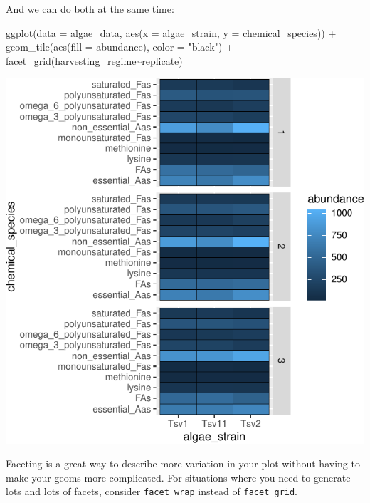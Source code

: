 \documentclass[
]{krantz}
\newenvironment{Shaded}{\begin{snugshade}}{\end{snugshade}}
\newcommand{\AttributeTok}[1]{\textcolor[rgb]{0.77,0.63,0.00}{#1}}
\newcommand{\FunctionTok}[1]{\textcolor[rgb]{0.00,0.00,0.00}{#1}}
\newcommand{\NormalTok}[1]{#1}
\newcommand{\SpecialCharTok}[1]{\textcolor[rgb]{0.00,0.00,0.00}{#1}}
\newcommand{\StringTok}[1]{\textcolor[rgb]{0.31,0.60,0.02}{#1}}
\begin{document}
And we can do both at the same time:

\begin{Shaded}
\begin{Highlighting}[]
\FunctionTok{ggplot}\NormalTok{(}\AttributeTok{data =}\NormalTok{ algae\_data, }\FunctionTok{aes}\NormalTok{(}\AttributeTok{x =}\NormalTok{ algae\_strain, }\AttributeTok{y =}\NormalTok{ chemical\_species)) }\SpecialCharTok{+} 
  \FunctionTok{geom\_tile}\NormalTok{(}\FunctionTok{aes}\NormalTok{(}\AttributeTok{fill =}\NormalTok{ abundance), }\AttributeTok{color =} \StringTok{"black"}\NormalTok{) }\SpecialCharTok{+} 
  \FunctionTok{facet\_grid}\NormalTok{(harvesting\_regime}\SpecialCharTok{\textasciitilde{}}\NormalTok{replicate)}
\end{Highlighting}
\end{Shaded}

\begin{center}\includegraphics{index_files/figure-latex/unnamed-chunk-58-1} \end{center}

Faceting is a great way to describe more variation in your plot without having to make your geoms more complicated. For situations where you need to generate lots and lots of facets, consider \texttt{facet\_wrap} instead of \texttt{facet\_grid}.
\end{document}
